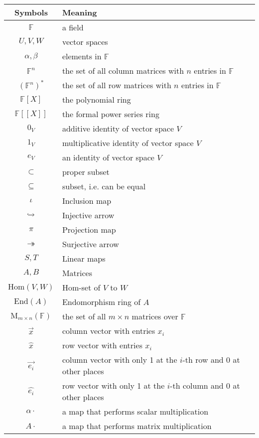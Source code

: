 \documentclass[
	11pt, %
	fleqn, %
	a4paper, %
]{LegrandOrangeBook}
\newcommand{\End}[1]{\text{End}(#1)} %
\newcommand{\Hom}{\text{Hom}} %
\newcommand{\F}{\mathbb{F}} %
\newcommand{\M}[2]{\text{M}_{#1}(#2)} %
\begin{document}
\noindent \begin{tabularx}{\textwidth}{cX}
    \toprule
    \textbf{Symbols} & \textbf{Meaning} \\
    \midrule
    $\F$ & a field \\
    $U, V, W$ & vector spaces \\
    $\alpha, \beta$ & elements in $\F$ \\
    $\F^n$ & the set of all column matrices with $n$ entries in $\F$ \\
    $(\F^n)^*$ & the set of all row matrices with $n$ entries in $\F$ \\
    $\F[X]$ & the polynomial ring \\
    $\F[[X]]$ & the formal power series ring \\
    \midrule
    $0_V$ & additive identity of vector space $V$ \\
    $1_V$ & multiplicative identity of vector space $V$ \\
    $e_V$ & an identity of vector space $V$ \\
    \midrule
    $\subset$ & proper subset \\
    $\subseteq$ & subset, i.e. can be equal \\
    \midrule
    $\iota$ & Inclusion map \\
    $\xhookrightarrow{}$ & Injective arrow \\
    $\pi$ & Projection map \\
    $\twoheadrightarrow$ & Surjective arrow \\
    \midrule
    $S, T$ & Linear maps \\
    $A, B$ & Matrices \\
    \midrule
    $\Hom(V, W)$ & Hom-set of $V$ to $W$ \\
    $\End{A}$ & Endomorphism ring of $A$ \\
    $\M{m \times n}{\F}$ & the set of all $m \times n$ matrices over $\F$ \\
    \midrule
    $\vec{x}$ & column vector with entries $x_i$ \\
    $\hat{x}$ & row vector with entries $x_i$ \\
    $\vec{e_i}$ & column vector with only 1 at the $i$-th row and 0 at other places \\
    $\hat{e_i}$ & row vector with only 1 at the $i$-th column and 0 at other places \\
    \midrule
    $\alpha \cdot$ & a map that performs scalar multiplication \\
    $A \cdot$ & a map that performs matrix multiplication \\
    \bottomrule
\end{tabularx}
\end{document}
